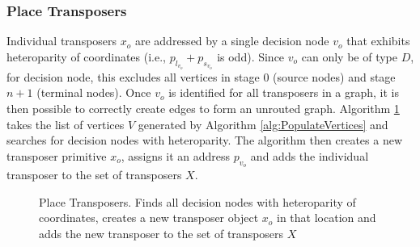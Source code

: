 \subsubsection{Place Transposers}
  Individual transposers $x_o$ are addressed by a single decision node $v_o$ that exhibits heteroparity of coordinates (i.e., $p_{l_{v_o}}+p_{s_{v_o}}$ is odd). Since $v_o$ can only be of type $D$, for decision node, this excludes all vertices in stage 0 (source nodes) and stage $n+1$ (terminal nodes). Once $v_o$ is identified for all transposers in a graph, it is then possible to correctly create edges to form an unrouted graph. Algorithm \ref{alg:PlaceXposers} takes the list of vertices $V$ generated by Algorithm \ref{alg:PopulateVertices} and searches for decision nodes with heteroparity. The algorithm then creates a new transposer primitive $x_o$, assigns it an address $p_{v_{o}}$ and adds the individual transposer to the set of transposers $X$. 

\begin{figure}
\begin{algorithm}[H]
\DontPrintSemicolon
{}
\caption{Place Transposers. Finds all decision nodes with heteroparity of coordinates, creates a new transposer object $x_o$ in that location and adds the new transposer to the set of transposers $X$ \label{alg:PlaceXposers}}
\end{algorithm}
\end{figure}

